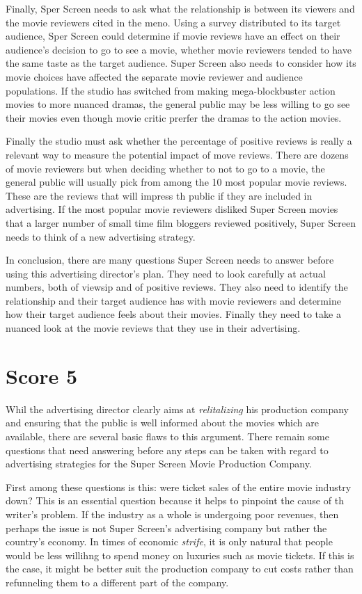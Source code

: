 Finally, Sper Screen needs to ask what the relationship is between its viewers and the movie reviewers cited in the meno.
Using a survey distributed to its target audience, Sper Screen could determine if movie reviews have an effect on their audience's decision to go to see a movie, whether movie reviewers tended to have the same taste as the target audience.
Super Screen also needs to consider how its movie choices have affected the separate movie reviewer and audience populations.
If the studio has switched from making mega-blockbuster action movies to more nuanced dramas, the general public may be less willing to go see their movies even though movie critic prerfer the dramas to the action movies.

Finally the studio must ask whether the percentage of positive reviews is really a relevant way to measure the potential impact of move reviews.
There are dozens of movie reviewers but when deciding whether to not to go to a movie, the general public will usually pick from among the 10 most popular movie reviews.
These are the reviews that will impress th public if they are included in advertising.
If the most popular movie reviewers disliked Super Screen movies that a larger number of small time film bloggers reviewed positively, Super Screen needs to think of a new advertising strategy.

In conclusion, there are many questions Super Screen needs to answer before using this advertising director's plan.
They need to look carefully at actual numbers, both of viewsip and of positive reviews.
They also need to identify the relationship and their target audience has with movie reviewers and determine how their target audience feels about their movies.
Finally they need to take a nuanced look at the movie reviews that they use in their advertising.


\section{Score 5}
Whil the advertising director clearly aims at \emph{relitalizing} his production company and ensuring that the public is well informed about the movies which are available, there are several basic flaws to this argument.
There remain some questions that need answering before any steps can be taken with regard to advertising strategies for the Super Screen Movie Production Company.

First among these questions is this: were ticket sales of the entire movie industry down?
This is an essential question because it helps to pinpoint the cause of th writer's problem.
If the industry as a whole is undergoing poor revenues, then perhaps the issue is not Super Screen's advertising company but rather the country's economy.
In times of economic \emph{strife}, it is only natural that people would be less willihng to spend money on luxuries such as movie tickets.
If this is the case, it might be better suit the production company to cut costs rather than refunneling them to a different part of the company.

